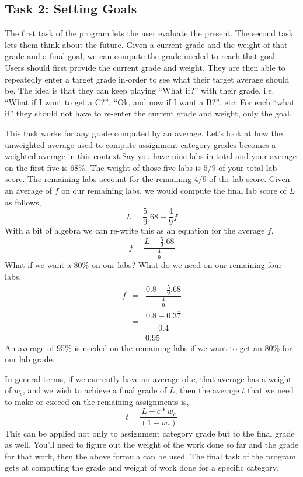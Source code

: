 \documentclass[]{tufte-handout}
\begin{document}
\subsection{Task 2: Setting Goals}

The first task of the program lets the user evaluate the present. The second task lets them think about the future. Given a current grade and the weight of that grade and a final goal, we can compute the grade needed to reach that goal. Users should first provide the current grade and weight. They are then able to repeatedly enter a target grade in-order to see what their target average should be. The idea is that they can keep playing ``What if?'' with their grade, i.e. ``What if I want to get a C?'', ``Ok, and now if I want a B?'', etc. For each ``what if'' they should not have to re-enter the current grade and weight, only the goal.

This task works for any grade computed by an average.  Let's look at how the unweighted average used to compute assignment category grades becomes a weighted average in this context.Say you have nine labs in total and your average on the first five is 68\%. The weight of those five labs is $5/9$ of your total lab score. The remaining labs account for the remaining $4/9$ of the lab score. Given an average of $f$ on our remaining labs, we would compute the final lab score of $L$ as follows,
\[
  L = \frac{5}{9}.68 + \frac{4}{9}f
\]
With a bit of algebra we can re-write this as an equation for the average $f$.
\[
  f = \dfrac{L - \frac{5}{9}.68}{\frac{4}{9}}
\]
What if we want a 80\% on our labs? What do we need on our remaining four labs.
\[
  \begin{array}{rcl}
    f &=& \dfrac{0.8 - \frac{5}{9}.68}{\frac{4}{9}} \\
      &=& \dfrac{0.8 - 0.3\overline{7}}{0.\overline{4}} \\
      &=& 0.95
  \end{array}
\]
An average of 95\% is needed on the remaining labs if we want to get an 80\% for our lab grade.

In general terms, if we currently have an average of $c$, that average has a weight of $w_c$, and we wish to achieve a final grade of $L$, then the average $t$ that we need to make or exceed on the remaining assignments is,
\[
  t = \dfrac{L - c*w_c}{(1-w_c)}
\]
This can be applied not only to assignment category grade but to the final grade as well. You'll need to figure out the weight of the work done so far and the grade for that work, then the above formula can be used. The final task of the program gets at computing the grade and weight of work done for a specific category.
\end{document}
